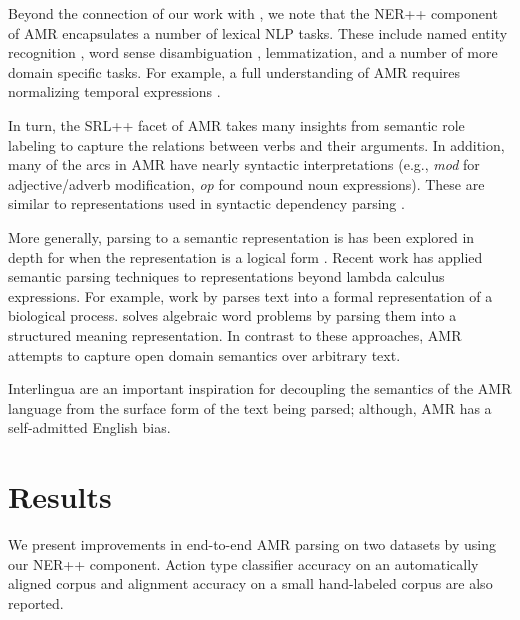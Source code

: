 \documentclass[11pt]{article}
\newcommand\e[1]{\textit{#1}} %
\begin{document}




Beyond the connection of our work with , we note that 
the NER++ component of AMR encapsulates a number of lexical NLP tasks.
These include named entity recognition \cite{2007nadeau-ner,stanford-ner},
  word sense disambiguation \cite{1995yarowsky-wsd,2002banerjee-wsd},
  lemmatization, and a number of more domain specific tasks.
For example, a full understanding of AMR requires normalizing temporal
  expressions \cite{2010verhagen-tempeval,2010strotgen-temporal,2012chang-temporal}.
 
In turn, the SRL++ facet of AMR takes many insights from semantic role labeling
  \cite{2002gildea-srl,2004punyakanok-srl,srikumar2013-srl} to capture the
  relations between verbs and their arguments.
In addition, many of the arcs in AMR have nearly syntactic interpretations
  (e.g., \e{mod} for adjective/adverb modification, \e{op} for compound noun
  expressions).
These are similar to representations used in syntactic dependency parsing
  \cite{stanford-dependencies,2005mcdonald-dependency0,2006buchholz-conll}.

More generally, parsing to a semantic representation is has been explored in
  depth for when the representation is a logical form
  \cite{2005kate-semantics,2005zettlemoyer-semantics,2011liang-semantics}.
Recent work has applied semantic parsing techniques to representations beyond
  lambda calculus expressions.
For example, work by  parses
  text into a formal representation of a biological process.
 solves algebraic word problems by parsing them
  into a structured meaning representation.
In contrast to these approaches, AMR attempts to capture open domain semantics
  over arbitrary text.

Interlingua
  \cite{1991mitamura-interlingua,1999carbonell-interlingua,1998levin-interlingua}
  are an important inspiration for decoupling the semantics of the AMR language
  from the surface form of the text being parsed; although, AMR has a self-admitted
  English bias.




\section{Results}
We present improvements in end-to-end AMR parsing on two datasets by using our NER++ component.
Action type classifier accuracy on an automatically aligned corpus
and alignment accuracy on a small hand-labeled corpus are also reported.
\end{document}
